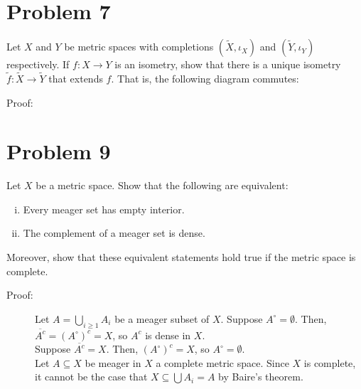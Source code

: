 \documentclass[10pt]{extarticle}
\begin{document}
  \section{Problem 7}%
  Let $X$ and $Y$ be metric spaces with completions $(\tilde{X},\iota_X)$ and $(\tilde{Y},\iota_Y)$ respectively. If $f: X\rightarrow Y$ is an isometry, show that there is a unique isometry $\tilde{f}: \tilde{X} \rightarrow \tilde{Y}$ that extends $f$. That is, the following diagram commutes:
  \begin{center}
  \end{center}
  \begin{description}
    \item[Proof:]
  \end{description}
  \section{Problem 9}%
  Let $X$ be a metric space. Show that the following are equivalent:
  \begin{enumerate}[(i)]
    \item Every meager set has empty interior.
    \item The complement of a meager set is dense.
  \end{enumerate}
  Moreover, show that these equivalent statements hold true if the metric space is complete.
  \begin{description}
    \item[Proof:] Let $A = \bigcup_{i\geq 1}A_i$ be a meager subset of $X$. Suppose $A^{\circ} = \emptyset$. Then, $\overline{A^{c}} = \left(A^{\circ}\right)^{c} = X$, so $A^{c}$ is dense in $X$.\\

      Suppose $\overline{A^{c}} = X$. Then, $\left(A^{\circ}\right)^{c} = X$, so $A^{\circ} = \emptyset$.\\

      Let $A\subseteq X$ be meager in $X$ a complete metric space. Since $X$ is complete, it cannot be the case that $X\subseteq \bigcup A_i = A$ by Baire's theorem. 
  \end{description}
\end{document}
